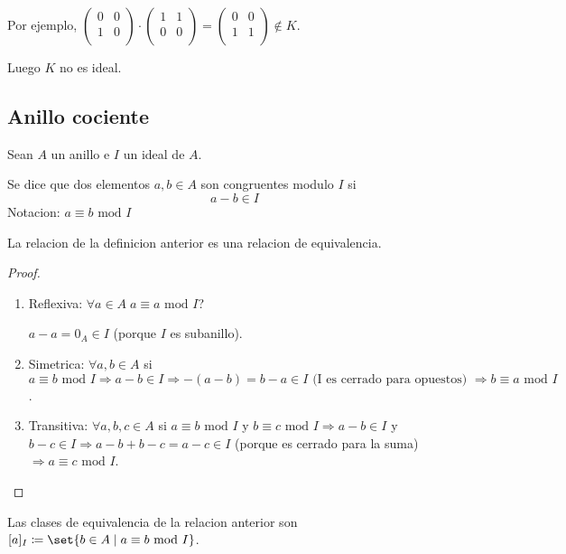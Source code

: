 \begin{example}
\begin{itemize}
		      Por ejemplo, \(\begin{pmatrix}
			      0 & 0 \\
			      1 & 0 \\
		      \end{pmatrix} \cdot \begin{pmatrix}
			      1 & 1 \\
			      0 & 0 \\
		      \end{pmatrix} = \begin{pmatrix}
			      0 & 0 \\
			      1 & 1 \\
		      \end{pmatrix} \not\in K\).
		      
		      Luego \(K \) no es ideal.
	\end{itemize}
\end{example}
\subsection{Anillo cociente}
\begin{definition}
	\label{congideal}
	Sean \(A \) un anillo e \(I \) un ideal de \(A \).
	
	Se dice que dos elementos \(a,b \in A \) son congruentes modulo \(I \) si
	\[
		a - b \in I
	\]
	Notacion: \(a \equiv b \text{ mod } I  \)
\end{definition}
\begin{proposition}
	La relacion de la definicion anterior es una relacion de equivalencia.
\end{proposition}
\begin{proof}
	\begin{enumerate}
		\item Reflexiva: \(\forall a \in A \; a \equiv a \text{ mod } I \)?
		      
		      \(a - a = 0_A \in I \) (porque \(I \) es subanillo).
		\item Simetrica: \(\forall a,b \in A \) si \(a \equiv b \text{ mod } I  \Rightarrow a - b \in I \Rightarrow -(a-b) = b - a \in I \text{ (I es cerrado para opuestos) } \Rightarrow b \equiv a \text{ mod } I \).
		\item Transitiva: \(\forall a,b,c \in A \) si \(a \equiv b \text{ mod } I \) y \(b \equiv c \text{ mod } I \Rightarrow a - b \in I\) y \(b - c \in I \Rightarrow a - b + b - c = a - c \in I \) (porque es cerrado para la suma) \(\Rightarrow a \equiv c \text{ mod } I \).
	\end{enumerate}
\end{proof}
Las clases de equivalencia de la relacion anterior son \([a]_I \coloneqq \set{b \in A \mid a \equiv b \text{ mod } I }\).

